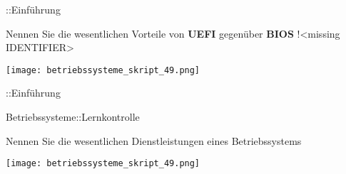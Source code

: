 \documentclass{article}
\begin{document}
\begin{tcolorbox}[colback=white!10!white,colframe=lightgray!75!black,
  savelowerto=\jobname_ex.tex]

\begin{center}
::Einführung

\end{center}

\tcblower

\justifying

\end{tcolorbox}
\begin{tcolorbox}[colback=white!10!white,colframe=lightgray!75!black,
  savelowerto=\jobname_ex.tex]

\begin{center}
Nennen Sie die wesentlichen Vorteile von 
\textbf{UEFI
} gegenüber 
\textbf{BIOS
}!<missing IDENTIFIER>

\end{center}

\tcblower

\justifying
\texttt{[image: betriebssysteme\_skript\_49.png]}

\end{tcolorbox}
\begin{tcolorbox}[colback=white!10!white,colframe=lightgray!75!black,
  savelowerto=\jobname_ex.tex]

\begin{center}
::Einführung

\end{center}

\tcblower

\justifying

\end{tcolorbox}
\begin{tcolorbox}[colback=white!10!white,colframe=lightgray!75!black,
  savelowerto=\jobname_ex.tex]

\begin{center}
Betriebssysteme::Lernkontrolle

\end{center}

\tcblower

\justifying

\end{tcolorbox}
\begin{tcolorbox}[colback=white!10!white,colframe=lightgray!75!black,
  savelowerto=\jobname_ex.tex]

\begin{center}
Nennen Sie die wesentlichen Dienstleistungen eines Betriebssystems

\end{center}

\tcblower

\justifying
\texttt{[image: betriebssysteme\_skript\_49.png]}

\end{tcolorbox}
\end{document}
